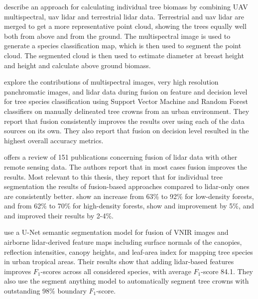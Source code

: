 \citet{lianBiomassCalculationsIndividual2022} describe an approach for calculating individual tree biomass by combining UAV multispectral, \gls{uav} \gls{lidar} and terrestrial \gls{lidar} data.
Terrestrial and \gls{uav} \gls{lidar} are merged to get a more representative point cloud, showing the trees equally well both from above and from the ground.
The multispectral image is used to generate a species classification map, which is then used to segment the point cloud.
The segmented cloud is then used to estimate diameter at breast height and height and calculate above ground biomass.

\citet{liFusionApproachesIndividual2023} explore the contributions of multispectral images, very high resolution panchromatic images, and \gls{lidar} data during fusion on feature and decision level for tree species classification using Support Vector Machine and Random Forest classifiers on manually delineated tree crowns from an urban environment.
They report that fusion consistently improves the results over using each of the data sources on its own.
They also report that fusion on decision level resulted in the highest overall accuracy metrics.

\citet{balestraLiDARDataFusion2024} offers a review of 151 publications concerning fusion of \gls{lidar} data with other remote sensing data.
The authors report that in most cases fusion improves the results.
Most relevant to this thesis, they report that for individual tree segmentation the results of fusion-based approaches compared to \gls{lidar}-only ones are consistently better.
\citet{laExtractionIndividualTree2015} show an increase from 63\% to 92\% for low-density forests, and from 62\% to 70\% for high-density forests, \citet{aubry-kientzMultisensorDataFusion2021} show and improvement by 5\%, and \citet{zhenImpactTreeOrientedGrowth2014} and \citet{arenas-corralizaAutomaticMappingTree2020} improved their results by 2-4\%.

\citet{ferreiraImprovingUrbanTree2024} use a U-Net semantic segmentation model for fusion of VNIR images and airborne \gls{lidar}-derived feature maps including surface normals of the canopies, reflection intensities, canopy heights, and leaf-area index for mapping tree species in urban tropical areas.
Their results show that adding \gls{lidar}-based features improves $F_1$-scores across all considered species, with average $F_1$-score 84.1.
They also use the segment anything model \citep{Kirillov_2023_ICCV} to automatically segment tree crowns with outstanding 98\% boundary $F_1$-score.


